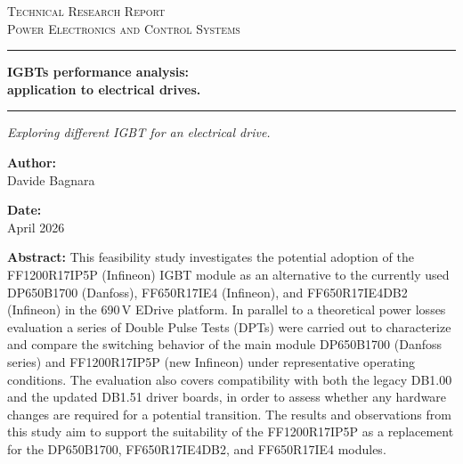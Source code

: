 \documentclass[12pt,a4paper,oneside]{book}
\newcommand{\DocCategory}{Technical Research Report}
\newcommand{\DocField}{Power Electronics and Control Systems}
\newcommand{\DocTitle}{%
	{\fontsize{20}{24}\selectfont\bfseries IGBTs performance analysis:} \\[16pt]
	{\fontsize{16}{20}\selectfont\bfseries application to electrical drives.}
}
\newcommand{\DocSubtitle}{%
	Exploring different IGBT for an electrical drive.
}
\newcommand{\DocAuthor}{Davide Bagnara}
\newcommand{\DocDate}{April 2026}
\newcommand{\DocAbstract}{%
This feasibility study investigates the potential adoption of the FF1200R17IP5P (Infineon) IGBT module as an alternative to the currently used DP650B1700 (Danfoss), FF650R17IE4 (Infineon), and FF650R17IE4DB2 (Infineon) in the 690\,V EDrive platform. In parallel to a theoretical power losses evaluation a series of Double Pulse Tests (DPTs) were carried out to characterize and compare the switching behavior of the main module DP650B1700 (Danfoss series)  and FF1200R17IP5P (new Infineon) under representative operating conditions. The evaluation also covers compatibility with both the legacy DB1.00 and the updated DB1.51 driver boards, in order to assess whether any hardware changes are required for a potential transition. The results and observations from this study aim to support the suitability of the FF1200R17IP5P as a replacement for the DP650B1700, FF650R17IE4DB2, and FF650R17IE4 modules.
}
\begin{document}
	\titlepage
	\begin{center}
		{\Large\scshape \DocCategory}\\[8pt]
		{\large\scshape \DocField}
	\end{center}
	
	\vspace{18pt}
	\noindent\rule{\linewidth}{0.8pt}
	
	\vspace{28pt}
	\begin{center}
		\DocTitle
	\end{center}
	
	\vspace{4pt}
	\noindent\rule{\linewidth}{2.2pt}
	
	\vspace{14pt}
	\begin{center}
		\begin{onehalfspace}
			{\large\itshape \DocSubtitle}
		\end{onehalfspace}
	\end{center}
	
	\vspace{18pt}
	
	\begin{minipage}{0.92\linewidth}
		\noindent
		\begin{minipage}[t]{0.48\linewidth}
			\textbf{Author:}\\[2pt]
			\DocAuthor
		\end{minipage}%
		\hfill
		\begin{minipage}[t]{0.48\linewidth}
			\raggedleft
			\textbf{Date:}\\[2pt]
			\DocDate
		\end{minipage}
	\end{minipage}
	\vspace{18pt}
	
	\begin{center}
		\begin{minipage}{0.85\linewidth}
			\footnotesize 
			\begin{onehalfspace}
				\textbf{Abstract:} \DocAbstract
			\end{onehalfspace}
		\end{minipage}
	\end{center}
	
\end{document}
